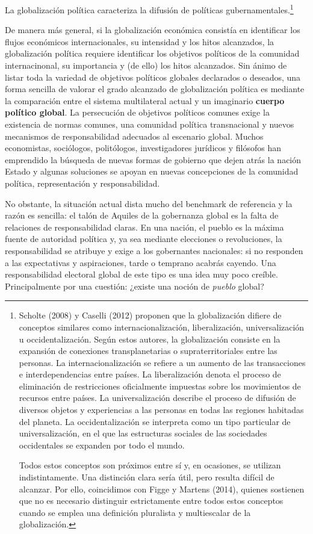 \documentclass[10pt,a4paper]{article}
\begin{document}
La globalización política caracteriza la difusión de políticas gubernamentales.\footnote{%
    Scholte (2008) y Caselli (2012) proponen que la globalización difiere de conceptos similares como internacionalización, liberalización, universalización u occidentalización. Según estos autores, la globalización consiste en la expansión de conexiones transplanetarias o supraterritoriales entre las personas. La internacionalización se refiere a un aumento de las transacciones e interdependencias entre países. La liberalización denota el proceso de eliminación de restricciones oficialmente impuestas sobre los movimientos de recursos entre países. La universalización describe el proceso de difusión de diversos objetos y experiencias a las personas en todas las regiones habitadas del planeta. La occidentalización se interpreta como un tipo particular de universalización, en el que las estructuras sociales de las sociedades occidentales se expanden por todo el mundo.

Todos estos conceptos son próximos entre sí y, en ocasiones, se utilizan indistintamente. Una distinción clara sería útil, pero resulta difícil de alcanzar. Por ello, coincidimos con Figge y Martens (2014), quienes sostienen que no es necesario distinguir estrictamente entre todos estos conceptos cuando se emplea una definición pluralista y multiescalar de la globalización.
}

De manera más general, si la globalización económica consistía en identificar los flujos económicos internacionales, su intensidad y los hitos alcanzados, la globalización política requiere identificar los objetivos políticos de la comunidad internacinonal, su importancia y (de ello) los hitos alcanzados. Sin ánimo de listar toda la variedad de objetivos políticos globales declarados o deseados, una forma sencilla de valorar el grado alcanzado de globalización política es mediante la comparación entre el sistema multilateral actual y un imaginario \textbf{cuerpo político global}. La persecución de objetivos políticos comunes exige la existencia de normas comunes, una comunidad política transnacional y nuevos mecanismos de responsabilidad adecuados al escenario global. Muchos economistas, sociólogos, politólogos, investigadores jurídicos y filósofos han emprendido la búsqueda de nuevas formas de gobierno que dejen atrás la nación Estado y algunas soluciones se apoyan en nuevas concepciones de la comunidad política, representación y responsabilidad. 

No obstante, la situación actual dista mucho del benchmark de referencia y la razón es sencilla: el talón de Aquiles de la gobernanza global es la falta de relaciones de responsabilidad claras. En una nación, el pueblo es la máxima fuente de autoridad política y, ya sea mediante elecciones o revoluciones, la responsabilidad se atribuye y exige a los gobernantes nacionales: si no responden a las expectativas y aspiraciones, tarde o temprano acabrás cayendo. Una responsabilidad electoral global de este tipo es una idea muy poco creíble. Principalmente por una cuestión: ¿existe una noción de \textit{pueblo} global?
\end{document}

